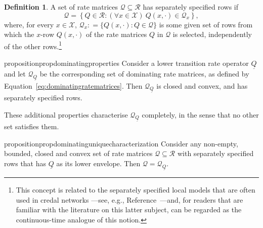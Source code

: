 \documentclass[10pt,a4paper]{paper}
\theoremstyle{definition}
\newtheorem{definition}{Definition}
\newcommand{\states}{\mathcal{X}}
\newcommand{\rateset}{\mathcal{Q}}
\newcommand{\lrate}{\underline{Q}}
\newcommand{\coloneqq}{:\!=}
\begin{document}
\begin{definition}\label{def:separatelyspecifiedrows}
A set of rate matrices $\rateset\subseteq\mathcal{R}$ has separately specified rows if
\begin{equation*}
\rateset=\left\{
Q\in\mathcal{R}
\colon
(\forall x\in\states)~Q(x,\cdot)\in\rateset_x\right\},
\end{equation*}
where, for every $x\in\states$, $\rateset_x\coloneqq\{Q(x,\cdot)\colon Q\in\rateset\}$ is some given set of rows from which the $x$-row $Q(x,\cdot)$ of the rate matrices $Q$ in $\rateset$ is selected, independently of the other rows.\footnote{This concept is related to the separately specified local models that are often used in credal networks ---see, e.g., Reference~\cite{daRocha:2002uf}---and, for readers that are familiar with the literature on this latter subject, can be regarded as the continuous-time analogue of this notion.}
\end{definition}

\begin{restatable}{proposition}{propdominatingproperties}
\label{prop:dominatingproperties}
Consider a lower transition rate operator $\lrate$ and let $\rateset_{\lrate}$ be the corresponding set of dominating rate matrices, as defined by Equation~\eqref{eq:dominatingratematrices}. Then $\rateset_{\lrate}$ is closed and convex, and has separately specified rows.
\end{restatable}

\noindent
These additional properties characterise $\rateset_{\lrate}$ completely, in the sense that no other set satisfies them.

\begin{restatable}{proposition}{propdominatinguniquecharacterization}
\label{prop:dominating_unique_characterization}
Consider any non-empty, bounded, closed and convex set of rate matrices $\rateset\subseteq\mathcal{R}$ with separately specified rows that has $\lrate$ as its lower envelope. Then $\rateset=\rateset_{\lrate}$.
\end{restatable}
\end{document}
